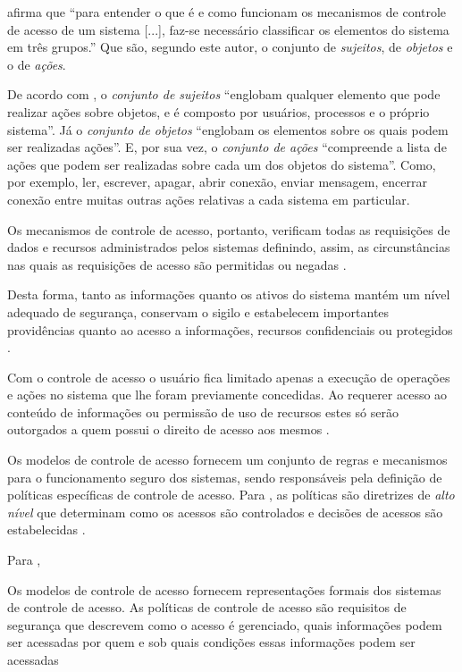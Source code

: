  afirma que ``para entender o que é e como funcionam os mecanismos de controle de acesso de um sistema [...], faz-se necessário classificar os elementos do sistema em três grupos.'' Que são, segundo este autor, o conjunto de \textit{sujeitos}, de \textit{objetos} e o de \textit{ações}.

De acordo com , o \textit{conjunto de sujeitos} ``englobam qualquer elemento que pode realizar ações sobre objetos, e é composto por usuários, processos e o próprio sistema''. Já o \textit{conjunto de objetos} ``englobam os elementos sobre os quais podem ser realizadas ações''. E, por sua vez, o \textit{conjunto de ações} ``compreende a lista de ações que podem ser realizadas sobre cada um dos objetos do sistema''. Como, por exemplo, ler, escrever, apagar, abrir conexão, enviar mensagem, encerrar conexão entre muitas outras ações relativas a cada sistema em particular.

Os mecanismos de controle de acesso, portanto, verificam todas as requisições de dados e recursos administrados pelos sistemas definindo, assim, as circunstâncias nas quais as requisições de acesso são permitidas ou negadas \cite{sandhu:1996}. 

Desta forma, tanto as informações quanto os ativos do sistema mantém um nível adequado de segurança, conservam o sigilo e estabelecem importantes providências quanto ao acesso a informações, recursos confidenciais ou protegidos \cite{wang_conflicts_2010}.

Com o controle de acesso o usuário fica limitado apenas a execução de operações e ações no sistema que lhe foram previamente concedidas. Ao requerer acesso ao conteúdo de informações ou permissão de uso de recursos estes só serão outorgados a quem possui o direito de acesso aos mesmos \cite{ferraiolo_proposed_2001}.

Os modelos de controle de acesso fornecem um conjunto de regras e mecanismos para o funcionamento seguro dos sistemas, sendo responsáveis pela definição de políticas específicas de controle de acesso. Para , as políticas são diretrizes de \textit{alto nível} que determinam como os acessos são controlados e decisões de acessos são estabelecidas \cite{di_vimercati_policies_2005} \cite{sarkis2017} \cite{lopes_adopcao_2012}.

Para ,
\begin{citacao}
	Os modelos de controle de acesso fornecem representações formais dos sistemas de controle de acesso. As políticas de controle de acesso são requisitos de segurança que descrevem como o acesso é gerenciado, quais informações podem ser acessadas por quem e sob quais condições essas informações podem ser acessadas
\end{citacao}


